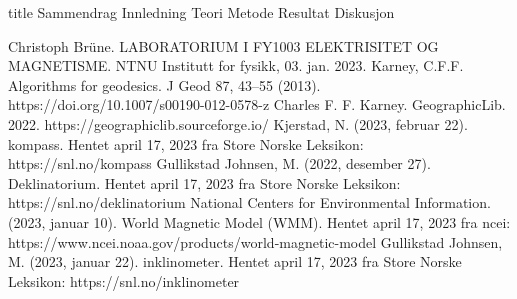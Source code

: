 \documentclass[5p]{article}
\begin{document}
{title} %
{Sammendrag}
\pagebreak
{Innledning}
{Teori}
{Metode}
{Resultat}
{Diskusjon}

\begin{thebibliography}{5}
Christoph Brüne. LABORATORIUM I FY1003 ELEKTRISITET OG MAGNETISME. NTNU Institutt for fysikk, 03. jan. 2023.
 Karney, C.F.F. Algorithms for geodesics. J Geod 87, 43–55 (2013). https://doi.org/10.1007/s00190-012-0578-z
 Charles F. F. Karney. GeographicLib. 2022.
https://geographiclib.sourceforge.io/
Kjerstad, N. (2023, februar 22). kompass. Hentet april 17, 2023 fra Store Norske Leksikon: https://snl.no/kompass
Gullikstad Johnsen, M. (2022, desember 27). Deklinatorium. Hentet april 17, 2023 fra Store Norske Leksikon: https://snl.no/deklinatorium
National Centers for Environmental Information. (2023, januar 10). World Magnetic Model (WMM). Hentet april 17, 2023 fra ncei: https://www.ncei.noaa.gov/products/world-magnetic-model
Gullikstad Johnsen, M. (2023, januar 22). inklinometer. Hentet april 17, 2023 fra Store Norske Leksikon: https://snl.no/inklinometer



\end{thebibliography}
\end{document}
